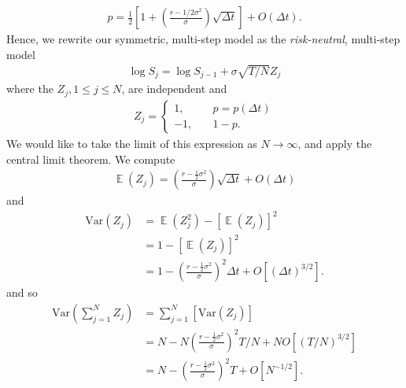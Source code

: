 \documentclass[12pt]{article}
\DeclareMathOperator{\ex}{\mathbb{E}}
\newcommand{\var}{\mathrm{Var}}
\theoremstyle{plain}
\theoremstyle{definition}
\theoremstyle{remark}
\numberwithin{equation}{section}  %
\begin{document}
	\begin{equation*}
		\begin{split}
			p = \frac{1}{2} \left[ 1 + \left( \frac{r - 1/2 \sigma^{2}}{\sigma}
			\right)\sqrt{\Delta t} \right]  + O(\Delta t).
		\end{split}
	\end{equation*}
	Hence, we rewrite our symmetric, multi-step model as the
	\emph{risk-neutral}, multi-step model
	\begin{equation*}
		\begin{split}
			\log S_{j} = \log S_{j-1} + \sigma \sqrt{T/N} Z_{j}
		\end{split}
	\end{equation*}
	where the $Z_{j}, 1 \le j \le N$, are independent and 
	\begin{equation*}
		\begin{split}
			Z_{j} = \begin{cases}
				1, \quad & p = p(\Delta t) \\
				-1, \quad & 1-p.
			\end{cases}
		\end{split}
	\end{equation*}
	We would like to take the limit of this expression as $N \to \infty$,
	and apply the central limit theorem. We compute
	\begin{equation*}
		\begin{split}
			\ex(Z_{j}) = \left( \frac{r - \frac{1}{2} \sigma^{2}}{\sigma}
			\right)\sqrt{\Delta t}  + O(\Delta t)
		\end{split}
	\end{equation*}
	and
	\begin{equation*}
		\begin{split}
			\var (Z_{j}) & = \ex(Z_{j}^2) - {[\ex(Z_{j})]}^{2} 
			\\
			& = 1 - {[\ex(Z_{j})]}^{2} 
			\\
			& = 1 - {\left( \frac{r - \frac{1}{2} \sigma^{2}}{\sigma}
		\right)}^{2}
		\Delta t  + O[{(\Delta t)}^{3/2}].
	\end{split}
\end{equation*}
and so
\begin{equation*}
	\begin{split}
		\var(\sum_{j=1}^{N} Z_{j}) 
		& = \sum_{j=1}^{N}[\var(Z_{j})]
		\\
		& = N - N {\left( \frac{r - \frac{1}{2} \sigma^{2}}{\sigma}
	\right)}^{2}
	T/N  + N O[{(T/N)}^{3/2}]
	\\
	& = N - {\left( \frac{r - \frac{1}{2} \sigma^{2}}{\sigma}
\right)}^{2}
T  + O[N^{-1/2}].
	\end{split}
\end{equation*}
\end{document}
